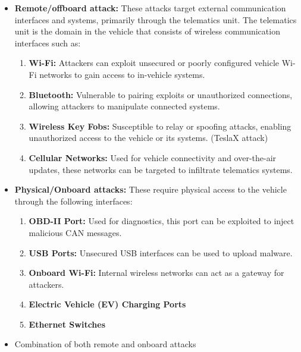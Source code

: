 \documentclass{report}
\begin{document}
\begin{itemize}
        \begin{itemize}
            \item \textbf{Remote/offboard attack:} These attacks target external communication interfaces and systems, primarily through the telematics unit. The telematics unit is the domain in the vehicle that consists of wireless communication interfaces such as:
            \begin{enumerate}
                \item \textbf{Wi-Fi:} Attackers can exploit unsecured or poorly configured vehicle Wi-Fi networks to gain access to in-vehicle systems.
                \item \textbf{Bluetooth:} Vulnerable to pairing exploits or unauthorized connections, allowing attackers to manipulate connected systems.
                \item \textbf{Wireless Key Fobs:} Susceptible to relay or spoofing attacks, enabling unauthorized access to the vehicle or its systems. (TeslaX attack)
                \item \textbf{Cellular Networks:} Used for vehicle connectivity and over-the-air updates, these networks can be targeted to infiltrate telematics systems.
            \end{enumerate}

            \item \textbf{Physical/Onboard attacks:} These require physical access to the vehicle through the following interfaces:
            \begin{enumerate}
                \item \textbf{OBD-II Port:} Used for diagnostics, this port can be exploited to inject malicious CAN messages.
                \item \textbf{USB Ports:} Unsecured USB interfaces can be used to upload malware.
                \item \textbf{Onboard Wi-Fi:} Internal wireless networks can act as a gateway for attackers.
                \item \textbf{Electric Vehicle (EV) Charging Ports}
                \item \textbf{Ethernet Switches}
            \end{enumerate}

            \item Combination of both remote and onboard attacks
        \end{itemize}
            

\end{itemize}
\end{document}
